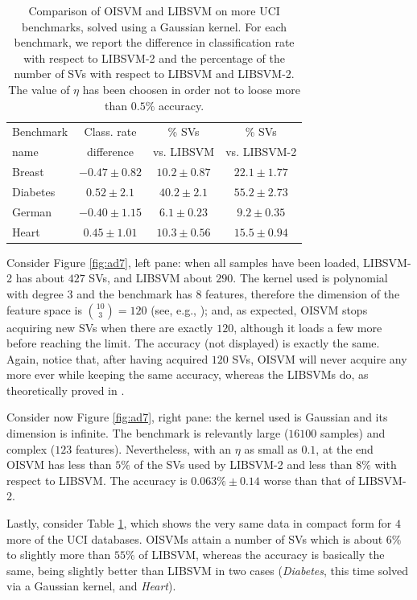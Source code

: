 \begin{table}
\begin{center}
\begin{tabular}[!h]{|l|c|c|c|}
\hline
  Benchmark & Class. rate    & \% SVs          & \% SVs        \\
       name & difference     & vs. LIBSVM      & vs. LIBSVM-2  \\ \hline
     Breast & $-0.47\pm0.82$ & $10.2\pm0.87$   & $22.1\pm1.77$ \\
   Diabetes & $0.52\pm2.1$   & $40.2\pm2.1$    & $55.2\pm2.73$ \\
   German   & $-0.40\pm1.15$ & $6.1\pm0.23$    & $9.2\pm0.35$  \\
   Heart    & $0.45\pm1.01$  & $10.3\pm0.56$   & $15.5\pm0.94$ \\ \hline
\end{tabular}
\end{center}
\label{table:t1}
\caption{Comparison of OISVM and LIBSVM on more UCI benchmarks, solved
 using a Gaussian kernel. For each benchmark, we report the difference
 in classification rate with respect to LIBSVM-2 and the
 percentage of the number of SVs with respect to LIBSVM and
 LIBSVM-2. The value of $\eta$ has been choosen in order not to loose
 more than $0.5\%$ accuracy.}
\end{table}

Consider Figure \ref{fig:ad7}, left pane: when all samples have been
loaded, LIBSVM-2 has about $427$ SVs, and LIBSVM about $290$. The
kernel used is polynomial with degree $3$ and the benchmark has $8$
features, therefore the dimension of the feature space is
$\binom{10}{3} = 120$ (see, e.g., \cite{Burges98}); and, as expected,
OISVM stops acquiring new SVs when there are exactly $120$, although
it loads a few more before reaching the limit. The accuracy (not
displayed) is exactly the same. Again, notice that, after having
acquired $120$ SVs, OISVM will never acquire any more ever while
keeping the same accuracy, whereas the LIBSVMs do, as theoretically
proved in \cite{Steinwart03}.

Consider now Figure \ref{fig:ad7}, right pane: the kernel used is
Gaussian and its dimension is infinite. The benchmark is relevantly
large ($16100$ samples) and complex ($123$ features). Nevertheless,
with an $\eta$ as small as $0.1$, at the end OISVM has less than $5\%$
of the SVs used by LIBSVM-2 and less than $8\%$ with respect to
LIBSVM. The accuracy is $0.063\%\pm0.14$ worse than that of LIBSVM-2.

Lastly, consider Table \ref{table:t1}, which shows the very same data
in compact form for $4$ more of the UCI databases. OISVMs attain a
number of SVs which is about $6\%$ to slightly more than $55\%$ of
LIBSVM, whereas the accuracy is basically the same, being slightly
better than LIBSVM in two cases (\emph{Diabetes}, this time solved via
a Gaussian kernel, and \emph{Heart}).
